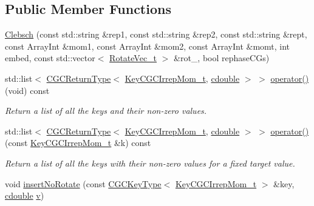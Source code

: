 \subsection*{Public Member Functions}
\begin{DoxyCompactItemize}
\item 
\mbox{\hyperlink{classHadron_1_1CGC_1_1CGCIrrepMomLGxLGtoLGEnv_1_1Clebsch_aec8b07c8384bf303329f17cac780ba25}{Clebsch}} (const std\+::string \&rep1, const std\+::string \&rep2, const std\+::string \&rept, const Array\+Int \&mom1, const Array\+Int \&mom2, const Array\+Int \&momt, int embed, const std\+::vector$<$ \mbox{\hyperlink{structHadron_1_1RotateVec__t}{Rotate\+Vec\+\_\+t}} $>$ \&rot\+\_\+, bool rephase\+C\+Gs)
\item 
std\+::list$<$ \mbox{\hyperlink{structHadron_1_1CGCReturnType}{C\+G\+C\+Return\+Type}}$<$ \mbox{\hyperlink{structHadron_1_1KeyCGCIrrepMom__t}{Key\+C\+G\+C\+Irrep\+Mom\+\_\+t}}, \mbox{\hyperlink{namespaceHadron_1_1CGC_a52d2b70e6792726fb525eab94daae53b}{cdouble}} $>$ $>$ \mbox{\hyperlink{classHadron_1_1CGC_1_1CGCIrrepMomLGxLGtoLGEnv_1_1Clebsch_a27a81332c929b1f421704680e794b796}{operator()}} (void) const
\begin{DoxyCompactList}\small\item\em Return a list of all the keys and their non-\/zero values. \end{DoxyCompactList}\item 
std\+::list$<$ \mbox{\hyperlink{structHadron_1_1CGCReturnType}{C\+G\+C\+Return\+Type}}$<$ \mbox{\hyperlink{structHadron_1_1KeyCGCIrrepMom__t}{Key\+C\+G\+C\+Irrep\+Mom\+\_\+t}}, \mbox{\hyperlink{namespaceHadron_1_1CGC_a52d2b70e6792726fb525eab94daae53b}{cdouble}} $>$ $>$ \mbox{\hyperlink{classHadron_1_1CGC_1_1CGCIrrepMomLGxLGtoLGEnv_1_1Clebsch_a8a003db7855154fba35df2485da43353}{operator()}} (const \mbox{\hyperlink{structHadron_1_1KeyCGCIrrepMom__t}{Key\+C\+G\+C\+Irrep\+Mom\+\_\+t}} \&k) const
\begin{DoxyCompactList}\small\item\em Return a list of all the keys with their non-\/zero values for a fixed target value. \end{DoxyCompactList}\item 
void \mbox{\hyperlink{classHadron_1_1CGC_1_1CGCIrrepMomLGxLGtoLGEnv_1_1Clebsch_a57c67efaf6fb826157a5c19a4066959e}{insert\+No\+Rotate}} (const \mbox{\hyperlink{structHadron_1_1CGCKeyType}{C\+G\+C\+Key\+Type}}$<$ \mbox{\hyperlink{structHadron_1_1KeyCGCIrrepMom__t}{Key\+C\+G\+C\+Irrep\+Mom\+\_\+t}} $>$ \&key, \mbox{\hyperlink{namespaceHadron_1_1CGC_a52d2b70e6792726fb525eab94daae53b}{cdouble}} \mbox{\hyperlink{adat__devel_2lib_2hadron_2hadron__timeslice_8cc_a716fc87f5e814be3ceee2405ed6ff22a}{v}})

\end{DoxyCompactItemize}
